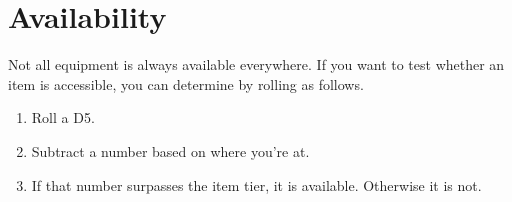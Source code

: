 \section{Availability}
Not all equipment is always available everywhere.
If you want to test whether an item is accessible,
	you can determine by rolling as follows.
\par
\begin{enumerate}
	\vspace{-10mm}
	\setlength\itemsep{-10mm}
	\item Roll a D5.
	\item Subtract a number based on where you’re at.
	\item If that number surpasses the item tier, it is available.
	Otherwise it is not.
\end{enumerate}
